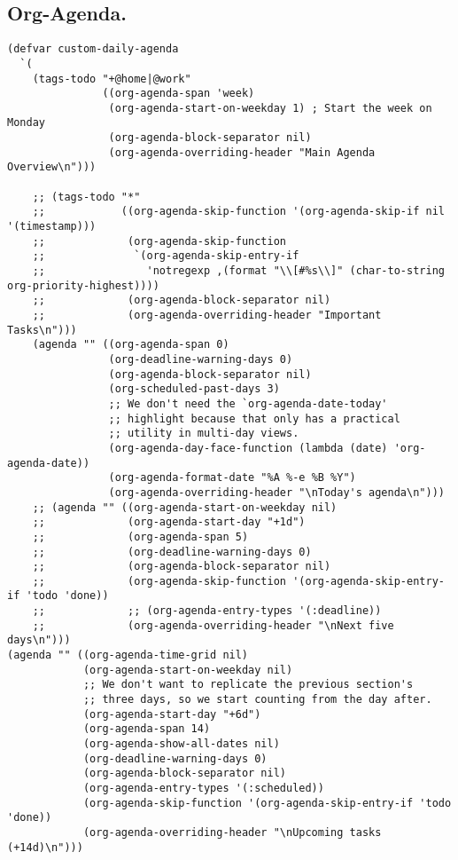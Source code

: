 \documentclass[11pt]{article}
\begin{document}
\subsection{Org-Agenda.}
\label{sec:org0aafbe4}
\begin{verbatim}
(defvar custom-daily-agenda
  `(
    (tags-todo "+@home|@work"
               ((org-agenda-span 'week)
                (org-agenda-start-on-weekday 1) ; Start the week on Monday
                (org-agenda-block-separator nil)
                (org-agenda-overriding-header "Main Agenda Overview\n")))

    ;; (tags-todo "*"
    ;;            ((org-agenda-skip-function '(org-agenda-skip-if nil '(timestamp)))
    ;;             (org-agenda-skip-function
    ;;              `(org-agenda-skip-entry-if
    ;;                'notregexp ,(format "\\[#%s\\]" (char-to-string org-priority-highest))))
    ;;             (org-agenda-block-separator nil)
    ;;             (org-agenda-overriding-header "Important Tasks\n")))
    (agenda "" ((org-agenda-span 0)
                (org-deadline-warning-days 0)
                (org-agenda-block-separator nil)
                (org-scheduled-past-days 3)
                ;; We don't need the `org-agenda-date-today'
                ;; highlight because that only has a practical
                ;; utility in multi-day views.
                (org-agenda-day-face-function (lambda (date) 'org-agenda-date))
                (org-agenda-format-date "%A %-e %B %Y")
                (org-agenda-overriding-header "\nToday's agenda\n")))
    ;; (agenda "" ((org-agenda-start-on-weekday nil)
    ;;             (org-agenda-start-day "+1d")
    ;;             (org-agenda-span 5)
    ;;             (org-deadline-warning-days 0)
    ;;             (org-agenda-block-separator nil)
    ;;             (org-agenda-skip-function '(org-agenda-skip-entry-if 'todo 'done))
    ;;             ;; (org-agenda-entry-types '(:deadline))
    ;;             (org-agenda-overriding-header "\nNext five days\n")))
(agenda "" ((org-agenda-time-grid nil)
            (org-agenda-start-on-weekday nil)
            ;; We don't want to replicate the previous section's
            ;; three days, so we start counting from the day after.
            (org-agenda-start-day "+6d")
            (org-agenda-span 14)
            (org-agenda-show-all-dates nil)
            (org-deadline-warning-days 0)
            (org-agenda-block-separator nil)
            (org-agenda-entry-types '(:scheduled))
            (org-agenda-skip-function '(org-agenda-skip-entry-if 'todo 'done))
            (org-agenda-overriding-header "\nUpcoming tasks (+14d)\n")))


\end{verbatim}
\end{document}

